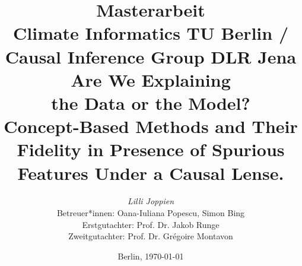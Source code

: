 %

\title{
{\small Masterarbeit}\\
{\small Climate Informatics TU Berlin / Causal Inference Group DLR Jena}\\
[7ex]
{Are We Explaining \\ the Data or the Model?} \\
[1ex]
{\LARGE Concept-Based Methods and
Their Fidelity in Presence of Spurious Features Under a Causal Lense.}}

\author{
{\emph{\normalsize Lilli Joppien}}\\
[18ex]   
{\normalsize Betreuer*innen: Oana-Iuliana Popescu, Simon Bing} \\
{\normalsize Erstgutachter: Prof. Dr. Jakob Runge} \\
{\normalsize Zweitgutachter: Prof. Dr. Grégoire Montavon }}
\vspace{6ex}
\date{\normalsize Berlin, \today}
\maketitle

\pagestyle{empty}
